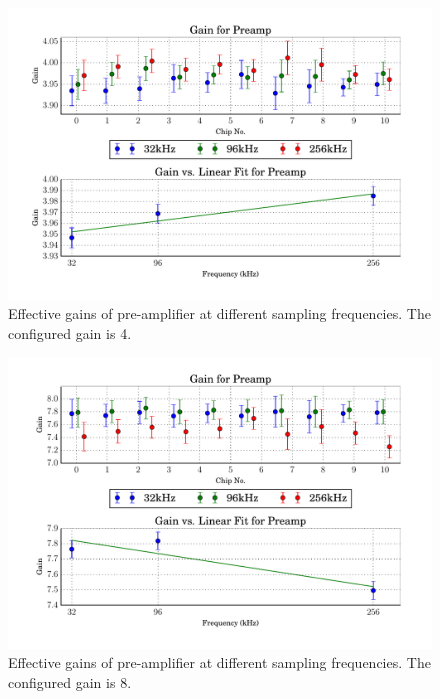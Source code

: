 \begin{figure}
    \centering
    \includegraphics[width=0.95\linewidth]{images/plots/dc_slope_preamp_gain+4.pdf}
    \caption{Effective gains of pre-amplifier at different sampling frequencies. The configured gain is 4.}
    \label{fig:preamp_slope+4}
\end{figure}
\begin{figure}
    \centering
    \includegraphics[width=0.95\linewidth]{images/plots/dc_slope_preamp_gain+8.pdf}
    \caption{Effective gains of pre-amplifier at different sampling frequencies. The configured gain is 8.}
    \label{fig:preamp_slope+8}
\end{figure}
